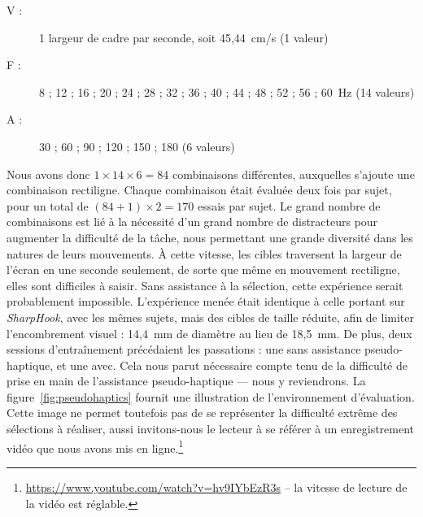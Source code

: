 	\begin{description}
		\item[V :] 1 largeur de cadre par seconde, soit 45,44~cm/s (1 valeur)
		\item[F :] 8 ; 12 ; 16 ; 20 ; 24 ; 28 ; 32 ; 36 ; 40 ; 44 ; 48 ; 52 ; 56 ; 60~Hz (14 valeurs)
		\item[A :] 30 ; 60 ; 90 ; 120 ; 150 ; 180\textdegree{} (6 valeurs)
	\end{description}
	
	Nous avons donc $1\times{}14\times{}6 = 84$ combinaisons différentes, auxquelles s'ajoute une combinaison rectiligne. Chaque combinaison était évaluée deux fois par sujet, pour un total de $(84+1)\times{}2 = 170$ essais par sujet. Le grand nombre de combinaisons est lié à la nécessité d'un grand nombre de distracteurs pour augmenter la difficulté de la tâche, nous permettant une grande diversité dans les natures de leurs mouvements. À cette vitesse, les cibles traversent la largeur de l'écran en une seconde seulement, de sorte que même en mouvement rectiligne, elles sont difficiles à saisir. Sans assistance à la sélection, cette expérience serait probablement impossible. L'expérience menée était identique à celle portant sur \emph{SharpHook}, avec les mêmes sujets, mais des cibles de taille réduite, afin de limiter l'encombrement visuel : 14,4~mm de diamètre au lieu de 18,5~mm. De plus, deux sessions d'entraînement précédaient les passations : une sans assistance pseudo-haptique, et une avec. Cela nous parut nécessaire compte tenu de la difficulté de prise en main de l'assistance pseudo-haptique --- nous y reviendrons. La figure~\ref{fig:pseudohaptics} fournit une illustration de l'environnement d'évaluation. Cette image ne permet toutefois pas de se représenter la difficulté extrême des sélections à réaliser, aussi invitons-nous le lecteur à se référer à un enregistrement vidéo que nous avons mis en ligne.\footnote{\url{https://www.youtube.com/watch?v=hv9IYbEzR3s} -- la vitesse de lecture de la vidéo est réglable.}
	
